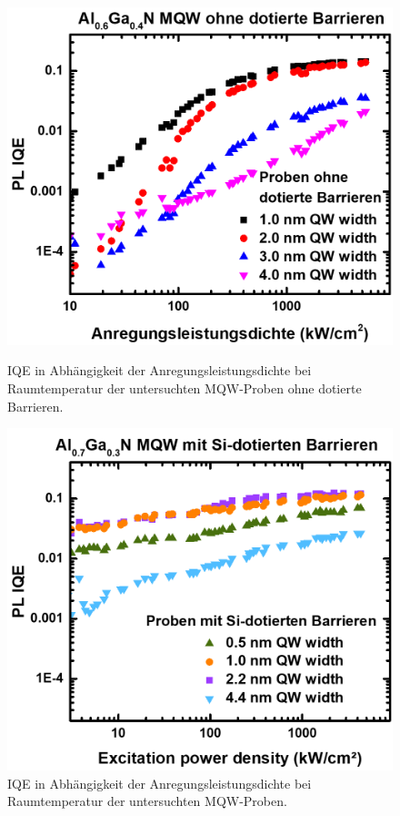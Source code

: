 \begin{figure}[H]
  \centering
  \begin{minipage}[t]{0.49\textwidth}
    \centering
    \includegraphics[width=\textwidth]{Bilder/MQWdickenSerie/IQEundotiert.png}
		\caption{IQE in Abhängigkeit der Anregungsleistungsdichte bei Raumtemperatur der untersuchten MQW-Proben ohne dotierte Barrieren.}
    \label{fig:undotiertIQE}
  \end{minipage}
	\hfill
  \begin{minipage}[t]{0.49\textwidth}
    \centering
    \includegraphics[width=\linewidth]{Bilder/MQWdickenSerie/IQEdotiert.png}
		\caption{IQE in Abhängigkeit der Anregungsleistungsdichte bei Raumtemperatur der untersuchten MQW-Proben.}
    \label{fig:dotiertIQE}
  \end{minipage}
\end{figure}
